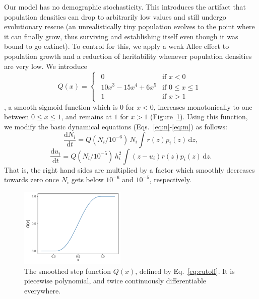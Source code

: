 \documentclass[10pt]{article}
\newcommand{\ud}{\text{d}}
\begin{document}
Our model has no demographic stochasticity. This introduces the artifact that population densities can drop to arbitrarily low values and still undergo evolutionary rescue (an unrealistically tiny population evolves to the point where it can finally grow, thus surviving and establishing itself even though it was bound to go extinct). To control for this, we apply a weak Allee effect to population growth and a reduction of heritability whenever population densities are very low. We introduce
\begin{equation}
  \label{eq:cutoff}
  Q(x) = \begin{cases}
    \begin{array}{ll}
      0 & \text{if~} x < 0 \\
      10x^3-15x^4+6x^5 & \text{if~} 0 \le x \le 1 \\
      1 & \text{if~} x > 1
    \end{array}
  \end{cases}
\end{equation}
\citep{akesson_importance_2021}, a smooth sigmoid function which is 0 for $x < 0$, increases monotonically to one between $0 \le x \le 1$, and remains at $1$ for $x > 1$ (Figure~\ref{fig:smoothstep}). Using this function, we modify the basic dynamical equations (Eqs.~\ref{eq:n}-\ref{eq:m}) as follows:%
\begin{equation}
  \label{eq:n-mod}
  \frac{\ud N_i}{\ud t} = Q(N_i / 10^{-6}) \, N_i \int r(z) p_i(z) \,\ud z ,
\end{equation}
\begin{equation}
  \label{eq:m-mod}
   \frac{\ud u_i}{\ud t} = Q(N_i / 10^{-5}) \, h_i^2 \int (z-u_i) r(z) p_i(z) \,\ud z .
\end{equation}
That is, the right hand sides are multiplied by a factor which smoothly decreases towards zero once $N_i$ gets below $10^{-6}$ and $10^{-5}$, respectively.

\begin{figure}[!ht]
  \centering
  \includegraphics[width=0.45\textwidth]{smoothstep.pdf}
  \caption{The smoothed step function $Q(x)$, defined by Eq.~\ref{eq:cutoff}. It is piecewise polynomial, and twice continuously differentiable everywhere.}
  \label{fig:smoothstep}
\end{figure}
\end{document}
